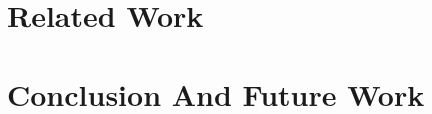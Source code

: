 \documentclass[sigconf,10pt]{acmart}
\begin{document}
\hypertarget{sec:related-work}{%
\section{Related Work}\label{sec:related-work}}

\hypertarget{sec:conclusion}{%
\section{Conclusion And Future Work}\label{sec:conclusion}}




\end{document}
